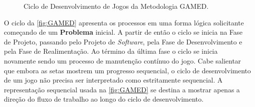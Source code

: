 \begin{figure}[!ht]

	\caption{\label{fig:GAMED}Ciclo de Desenvolvimento de Jogos da Metodologia GAMED.}
  \begin{center}%
	\end{center}%

\end{figure}


O ciclo da \autoref{fig:GAMED} apresenta os processos em uma forma lógica solicitante começando de um \textbf{Problema} inicial. A partir de então o ciclo se inicia na Fase de Projeto, passando pelo Projeto de \textit{Software}, pela Fase de Desenvolvimento e pela Fase de Realimentação. Ao término da última fase o ciclo se inicia novamente sendo um processo de manutenção contínuo do jogo. Cabe salientar que embora as setas mostrem um progresso sequencial, o ciclo de desenvolvimento de um jogo não precisa ser interpretado como estritamente sequencial. A representação sequencial usada na \autoref{fig:GAMED} se destina a mostrar apenas a direção do fluxo de trabalho ao longo do ciclo de desenvolvimento. 

\pagebreak

